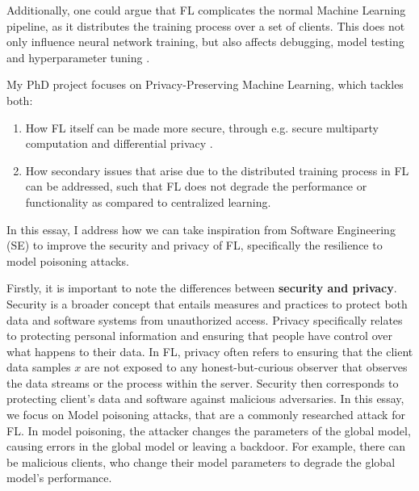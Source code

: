 \documentclass[11pt]{article}
\begin{document}
Additionally, one could argue that FL complicates the normal Machine Learning pipeline, as it distributes the training process over a set of clients. This does not only influence neural network training, but also affects debugging, model testing and hyperparameter tuning \cite{kairouz2021advances}. %

My PhD project focuses on Privacy-Preserving Machine Learning, which tackles both: 
\begin{enumerate}
    \item How FL itself can be made more secure, through e.g. secure multiparty computation \cite{bonawitz2017practical} and differential privacy \cite{wei2020federated}. %
    \item How secondary issues that arise due to the distributed training process in FL can be addressed, such that FL does not degrade the performance or functionality as compared to centralized learning.  %
\end{enumerate}

In this essay, I address how we can take inspiration from Software Engineering (SE) to improve the security and privacy of FL, specifically the resilience to model poisoning attacks. 

Firstly, it is important to note the differences between \textbf{security and privacy}. Security is a broader concept that entails measures and practices to protect both data and software systems from unauthorized access. Privacy specifically relates to protecting personal information and ensuring that people have control over what happens to their data.
In FL, privacy often refers to ensuring that the client data samples $x$ are not exposed to any honest-but-curious observer that observes the data streams or the process within the server. Security then corresponds to protecting client's data and software against malicious adversaries. 
In this essay, we focus on Model poisoning attacks, that are a commonly researched attack for FL. In model poisoning, the attacker changes the parameters of the global model, causing errors in the global model or leaving a backdoor. For example, there can be malicious clients, who change their model parameters to degrade the global model's performance.  
\end{document}
